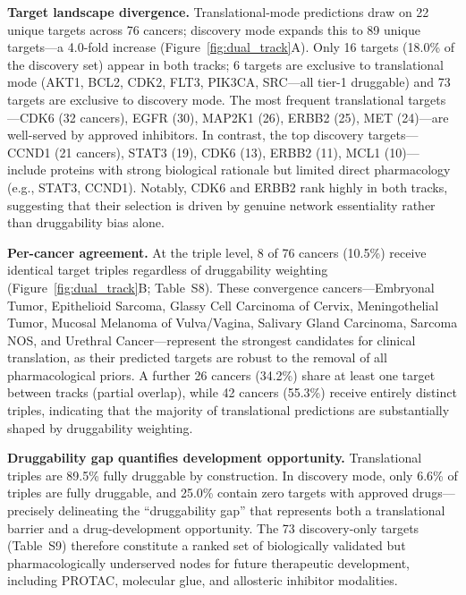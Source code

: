 \documentclass[times, twoside, watermark]{zHenriquesLab-StyleBioRxiv}
\begin{document}
\textbf{Target landscape divergence.}
Translational-mode predictions draw on 22 unique targets across 76 cancers; discovery mode expands this to 89 unique targets---a 4.0-fold increase (Figure~\ref{fig:dual_track}A). Only 16 targets (18.0\% of the discovery set) appear in both tracks; 6 targets are exclusive to translational mode (AKT1, BCL2, CDK2, FLT3, PIK3CA, SRC---all tier-1 druggable) and 73 targets are exclusive to discovery mode. The most frequent translational targets---CDK6 (32 cancers), EGFR (30), MAP2K1 (26), ERBB2 (25), MET (24)---are well-served by approved inhibitors. In contrast, the top discovery targets---CCND1 (21 cancers), STAT3 (19), CDK6 (13), ERBB2 (11), MCL1 (10)---include proteins with strong biological rationale but limited direct pharmacology (e.g., STAT3, CCND1). Notably, CDK6 and ERBB2 rank highly in both tracks, suggesting that their selection is driven by genuine network essentiality rather than druggability bias alone.

\textbf{Per-cancer agreement.}
At the triple level, 8 of 76 cancers (10.5\%) receive identical target triples regardless of druggability weighting (Figure~\ref{fig:dual_track}B; Table~S8). These convergence cancers---Embryonal Tumor, Epithelioid Sarcoma, Glassy Cell Carcinoma of Cervix, Meningothelial Tumor, Mucosal Melanoma of Vulva/Vagina, Salivary Gland Carcinoma, Sarcoma NOS, and Urethral Cancer---represent the strongest candidates for clinical translation, as their predicted targets are robust to the removal of all pharmacological priors. A further 26 cancers (34.2\%) share at least one target between tracks (partial overlap), while 42 cancers (55.3\%) receive entirely distinct triples, indicating that the majority of translational predictions are substantially shaped by druggability weighting.

\textbf{Druggability gap quantifies development opportunity.}
Translational triples are 89.5\% fully druggable by construction. In discovery mode, only 6.6\% of triples are fully druggable, and 25.0\% contain zero targets with approved drugs---precisely delineating the ``druggability gap'' that represents both a translational barrier and a drug-development opportunity. The 73 discovery-only targets (Table~S9) therefore constitute a ranked set of biologically validated but pharmacologically underserved nodes for future therapeutic development, including PROTAC, molecular glue, and allosteric inhibitor modalities.
\end{document}
